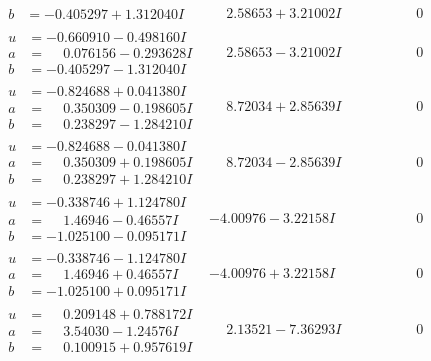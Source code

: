 \documentclass[1p]{elsarticle_modified}
\theoremstyle{definition}
\begin{document}
$$\begin{array}{c|c|c}
\begin{aligned}
b &= -0.405297 + 1.312040 I\end{aligned}
 & \phantom{-}2.58653 + 3.21002 I & \phantom{-0.000000 } 0 \\ \hline\begin{aligned}
u &= -0.660910 - 0.498160 I \\
a &= \phantom{-}0.076156 - 0.293628 I \\
b &= -0.405297 - 1.312040 I\end{aligned}
 & \phantom{-}2.58653 - 3.21002 I & \phantom{-0.000000 } 0 \\ \hline\begin{aligned}
u &= -0.824688 + 0.041380 I \\
a &= \phantom{-}0.350309 - 0.198605 I \\
b &= \phantom{-}0.238297 - 1.284210 I\end{aligned}
 & \phantom{-}8.72034 + 2.85639 I & \phantom{-0.000000 } 0 \\ \hline\begin{aligned}
u &= -0.824688 - 0.041380 I \\
a &= \phantom{-}0.350309 + 0.198605 I \\
b &= \phantom{-}0.238297 + 1.284210 I\end{aligned}
 & \phantom{-}8.72034 - 2.85639 I & \phantom{-0.000000 } 0 \\ \hline\begin{aligned}
u &= -0.338746 + 1.124780 I \\
a &= \phantom{-}1.46946 - 0.46557 I \\
b &= -1.025100 - 0.095171 I\end{aligned}
 & -4.00976 - 3.22158 I & \phantom{-0.000000 } 0 \\ \hline\begin{aligned}
u &= -0.338746 - 1.124780 I \\
a &= \phantom{-}1.46946 + 0.46557 I \\
b &= -1.025100 + 0.095171 I\end{aligned}
 & -4.00976 + 3.22158 I & \phantom{-0.000000 } 0 \\ \hline\begin{aligned}
u &= \phantom{-}0.209148 + 0.788172 I \\
a &= \phantom{-}3.54030 - 1.24576 I \\
b &= \phantom{-}0.100915 + 0.957619 I\end{aligned}
 & \phantom{-}2.13521 - 7.36293 I & \phantom{-0.000000 } 0 \\ \hline\begin{aligned}

\end{aligned}
\end{array}$$
\end{document}
